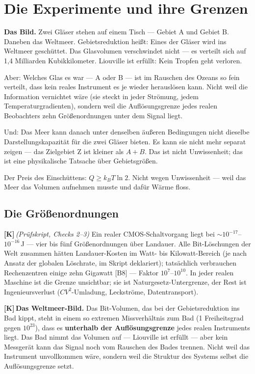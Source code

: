 \documentclass[11pt,a4paper]{article}
\newcommand{\LK}{\textcolor{layK}{\textbf{\footnotesize\textsf{[K]}}}\,}
\newcommand{\pruef}[1]{{\small\itshape(Prüfskript, #1)}}
\begin{document}
\section{Die Experimente und ihre Grenzen}
\label{sec:experimente}

\textbf{Das Bild.} Zwei Gläser stehen auf einem Tisch --- Gebiet A und Gebiet B.
Daneben das Weltmeer. Gebietsreduktion heißt: Eines der Gläser wird ins Weltmeer
geschüttet. Das Glasvolumen verschwindet nicht --- es verteilt sich auf 1,4
Milliarden Kubikkilometer. Liouville ist erfüllt: Kein Tropfen geht verloren.

Aber: Welches Glas es war --- A oder B --- ist im Rauschen des Ozeans so fein
verteilt, dass kein reales Instrument es je wieder herauslösen kann. Nicht weil
die Information vernichtet wäre (sie steckt in jeder Strömung, jedem
Temperaturgradienten), sondern weil die Auflösungsgrenze jedes realen Beobachters
zehn Größenordnungen unter dem Signal liegt.

Und: Das Meer kann danach unter denselben äußeren Bedingungen nicht dieselbe
Darstellungskapazität für die zwei Gläser bieten. Es kann sie nicht mehr separat
zeigen --- das Zielgebiet Z ist kleiner als $A+B$. Das ist nicht Unwissenheit; das
ist eine physikalische Tatsache über Gebietsgrößen.

Der Preis des Einschüttens: $Q \ge k_B T \ln 2$. Nicht wegen Unwissenheit ---
weil das Meer das Volumen aufnehmen musste und dafür Wärme floss.

\subsection{Die Größenordnungen}

\LK \pruef{Checks 2--3} Ein realer CMOS-Schaltvorgang liegt bei
${\sim}10^{-17}$--$10^{-16}$\,J --- vier bis fünf Größenordnungen über Landauer.
Alle Bit-Löschungen der Welt zusammen hätten Landauer-Kosten im Watt- bis
Kilowatt-Bereich (je nach Ansatz der globalen Löschrate, im Skript deklariert);
tatsächlich verbrauchen Rechenzentren einige zehn Gigawatt [B8] --- Faktor
$10^{7}$--$10^{10}$. In jeder realen Maschine ist die Grenze unsichtbar; sie ist
Naturgesetz-Untergrenze, der Rest ist Ingenieursverlust
($CV^2$-Umladung, Leckströme, Datentransport).

\LK \textbf{Das Weltmeer-Bild.} Das Bit-Volumen, das bei der Gebietsreduktion ins
Bad kippt, steht in einem so extremen Missverhältnis zum Bad (1 Freiheitsgrad
gegen $10^{23}$), dass es \textbf{unterhalb der Auflösungsgrenze} jedes realen
Instruments liegt. Das Bad nimmt das Volumen auf --- Liouville ist erfüllt ---
aber kein Messgerät kann das Signal noch vom Rauschen des Bades trennen. Nicht
weil das Instrument unvollkommen wäre, sondern weil die Struktur des Systems
selbst die Auflösungsgrenze setzt.
\end{document}
